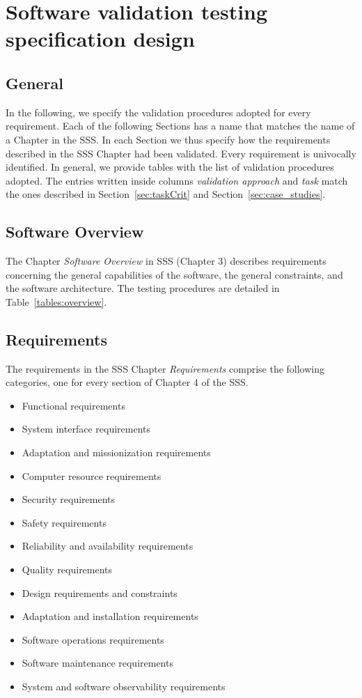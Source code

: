 \chapter{Software validation testing specification design}

\section{General}

In the following, we specify the validation procedures adopted for every requirement. Each of the following Sections has a name that matches the name of a Chapter in the SSS. In each Section we thus specify how the requirements described in the SSS Chapter had been validated.
Every requirement is univocally identified. In general, we provide tables with the list of validation procedures adopted.
The entries written inside columns \emph{validation approach} and \emph{task} match the ones described in Section~\ref{sec:taskCrit} and Section~\ref{sec:case_studies}.

\section{Software Overview}
The Chapter \emph{Software Overview} in SSS (Chapter 3) describes requirements concerning the general capabilities of the software, the general constraints, and the software architecture.
The testing procedures are detailed in Table~\ref{tables:overview}.



\clearpage
\section{Requirements}

The requirements in the SSS Chapter \emph{Requirements} comprise the following categories, one for every section of Chapter 4 of the SSS.

\begin{itemize}
  \item Functional requirements
  \item System interface requirements
  \item Adaptation and missionization requirements
  \item Computer resource requirements
  \item Security requirements
  \item Safety requirements
  \item Reliability and availability requirements
  \item Quality requirements
  \item Design requirements and constraints
  \item Adaptation and installation requirements
  \item Software operations requirements
  \item Software maintenance requirements
  \item System and software observability requirements
\end{itemize}

